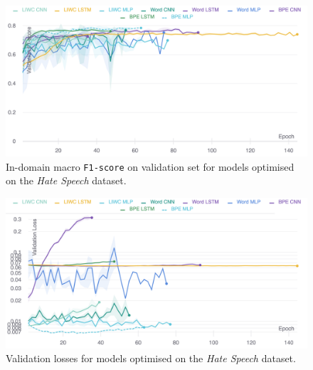 \begin{figure}  
    \centering  
    \includegraphics[width=\textwidth]{waseem_hovy_dev_f1.pdf}  
    \caption{In-domain macro \texttt{F1-score} on validation set for models optimised on the \textit{Hate Speech} dataset.}  
    \label{fig:waseem_hovy_dev_f1}  
\end{figure}  
\begin{figure}  
    \centering  
    \includegraphics[width=\textwidth]{waseem_hovy_dev_loss_stderr_logscale.pdf}  
    \caption{Validation losses for models optimised on the \textit{Hate Speech} dataset.}  
    \label{fig:waseem_hovy_dev_loss}  
\end{figure}  
  
